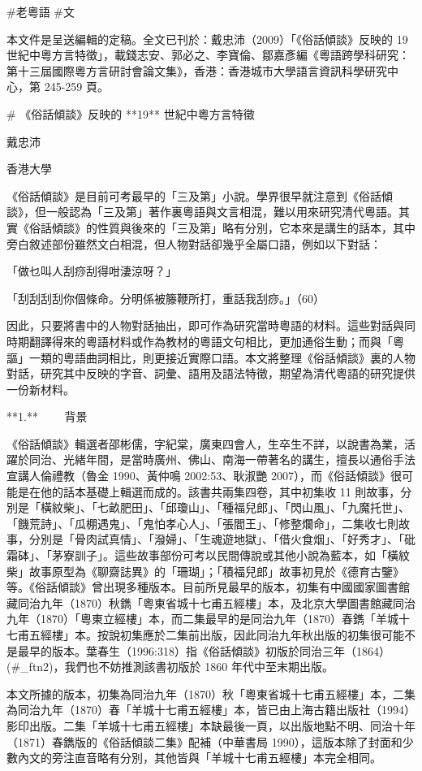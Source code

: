 #老粵語 #文

本文件是呈送編輯的定稿。全文已刊於：戴忠沛（2009）「《俗話傾談》反映的 19 世紀中粵方言特徵」，載錢志安、郭必之、李寶倫、鄒嘉彥編《粵語跨學科研究：第十三屆國際粵方言研討會論文集》，香港：香港城市大學語言資訊科學研究中心，第 245-259 頁。

# 《俗話傾談》反映的 **19** 世紀中粵方言特徵

戴忠沛

香港大學

《俗話傾談》是目前可考最早的「三及第」小說。學界很早就注意到《俗話傾談》，但一般認為「三及第」著作裏粵語與文言相混，難以用來研究清代粵語。其實《俗話傾談》的性質與後來的「三及第」略有分別，它本來是講生的話本，其中旁白敘述部份雖然文白相混，但人物對話卻幾乎全屬口語，例如以下對話：

「做乜叫人刮痧刮得咁淒涼呀？」

「刮刮刮刮你個條命。分明係被籐鞭所打，重話我刮痧。」（60）

因此，只要將書中的人物對話抽出，即可作為研究當時粵語的材料。這些對話與同時期翻譯得來的粵語材料或作為教材的粵語文句相比，更加通俗生動；而與「粵謳」一類的粵語曲詞相比，則更接近實際口語。本文將整理《俗話傾談》裏的人物對話，研究其中反映的字音、詞彙、語用及語法特徵，期望為清代粵語的研究提供一份新材料。

**1.**     背景

《俗話傾談》輯選者邵彬儒，字紀棠，廣東四會人，生卒生不詳，以說書為業，活躍於同治、光緒年間，是當時廣州、佛山、南海一帶著名的講生，擅長以通俗手法宣講人倫禮教（魯金 1990、黃仲鳴 2002:53、耿淑艷 2007），而《俗話傾談》很可能是在他的話本基礎上輯選而成的。該書共兩集四卷，其中初集收 11 則故事，分別是「橫紋柴」、「七畝肥田」、「邱瓊山」、「種福兒郎」、「閃山風」、「九魔托世」、「饑荒詩」、「瓜棚遇鬼」、「鬼怕孝心人」、「張閻王」、「修整爛命」，二集收七則故事，分別是「骨肉試真情」、「潑婦」、「生魂遊地獄」、「借火食烟」、「好秀才」、「砒霜砵」、「茅寮訓子」。這些故事部份可考以民間傳說或其他小說為藍本，如「橫紋柴」故事原型為《聊齋誌異》的「珊瑚」；「積福兒郎」故事初見於《德育古鑒》等。《俗話傾談》曾出現多種版本。目前所見最早的版本，初集有中國國家圖書館藏同治九年（1870）秋鐫「粵東省城十七甫五經樓」本，及北京大學圖書館藏同治九年（1870）「粵東立經樓」本，而二集最早的是同治九年（1870）春鐫「羊城十七甫五經樓」本。按說初集應於二集前出版，因此同治九年秋出版的初集很可能不是最早的版本。葉春生（1996:318）指《俗話傾談》初版於同治三年（1864）(#_ftn2)，我們也不妨推測該書初版於 1860 年代中至末期出版。

本文所據的版本，初集為同治九年（1870）秋「粵東省城十七甫五經樓」本，二集為同治九年（1870）春「羊城十七甫五經樓」本，皆已由上海古籍出版社（1994）影印出版。二集「羊城十七甫五經樓」本缺最後一頁，以出版地點不明、同治十年（1871）春鐫版的《俗話傾談二集》配補（中華書局 1990），這版本除了封面和少數內文的旁注直音略有分別，其他皆與「羊城十七甫五經樓」本完全相同。


